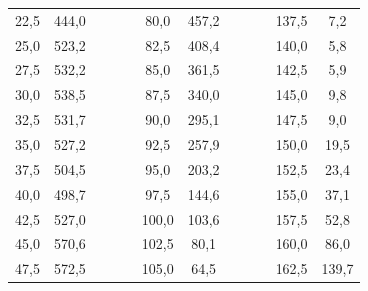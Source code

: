 \begin{table}[h!]
\begin{tabular}{|c|c|ccc|c|c|ccccc}
				22,5    & 444,0          &  &  &  & 80,0    & 457,2          &  &  & \multicolumn{1}{c|}{} & \multicolumn{1}{c|}{137,5}   & \multicolumn{1}{c|}{7,2}            \\ \cline{1-2} \cline{6-7} \cline{11-12} 
				25,0    & 523,2          &  &  &  & 82,5    & 408,4          &  &  & \multicolumn{1}{c|}{} & \multicolumn{1}{c|}{140,0}   & \multicolumn{1}{c|}{5,8}            \\ \cline{1-2} \cline{6-7} \cline{11-12} 
				27,5    & 532,2          &  &  &  & 85,0    & 361,5          &  &  & \multicolumn{1}{c|}{} & \multicolumn{1}{c|}{142,5}   & \multicolumn{1}{c|}{5,9}            \\ \cline{1-2} \cline{6-7} \cline{11-12} 
				30,0    & 538,5          &  &  &  & 87,5    & 340,0          &  &  & \multicolumn{1}{c|}{} & \multicolumn{1}{c|}{145,0}   & \multicolumn{1}{c|}{9,8}            \\ \cline{1-2} \cline{6-7} \cline{11-12} 
				32,5    & 531,7          &  &  &  & 90,0    & 295,1          &  &  & \multicolumn{1}{c|}{} & \multicolumn{1}{c|}{147,5}   & \multicolumn{1}{c|}{9,0}            \\ \cline{1-2} \cline{6-7} \cline{11-12} 
				35,0    & 527,2          &  &  &  & 92,5    & 257,9          &  &  & \multicolumn{1}{c|}{} & \multicolumn{1}{c|}{150,0}   & \multicolumn{1}{c|}{19,5}           \\ \cline{1-2} \cline{6-7} \cline{11-12} 
				37,5    & 504,5          &  &  &  & 95,0    & 203,2          &  &  & \multicolumn{1}{c|}{} & \multicolumn{1}{c|}{152,5}   & \multicolumn{1}{c|}{23,4}           \\ \cline{1-2} \cline{6-7} \cline{11-12} 
				40,0    & 498,7          &  &  &  & 97,5    & 144,6          &  &  & \multicolumn{1}{c|}{} & \multicolumn{1}{c|}{155,0}   & \multicolumn{1}{c|}{37,1}           \\ \cline{1-2} \cline{6-7} \cline{11-12} 
				42,5    & 527,0          &  &  &  & 100,0   & 103,6          &  &  & \multicolumn{1}{c|}{} & \multicolumn{1}{c|}{157,5}   & \multicolumn{1}{c|}{52,8}           \\ \cline{1-2} \cline{6-7} \cline{11-12} 
				45,0    & 570,6          &  &  &  & 102,5   & 80,1           &  &  & \multicolumn{1}{c|}{} & \multicolumn{1}{c|}{160,0}   & \multicolumn{1}{c|}{86,0}           \\ \cline{1-2} \cline{6-7} \cline{11-12} 
				47,5    & 572,5          &  &  &  & 105,0   & 64,5           &  &  & \multicolumn{1}{c|}{} & \multicolumn{1}{c|}{162,5}   & \multicolumn{1}{c|}{139,7}          \\ \cline{1-2} \cline{6-7} \cline{11-12} 

\end{tabular}
\end{table}
